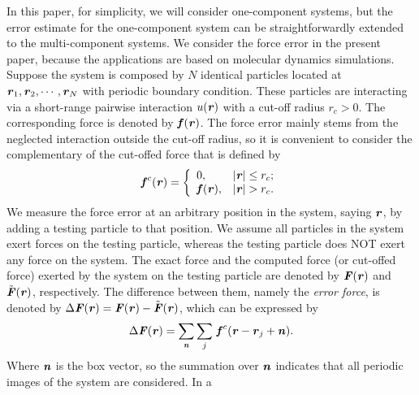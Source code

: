 \documentclass[preprint]{revtex4}
\renewcommand{\v}[1]{\textbf{\textit{#1}}}
\begin{document}
In this paper, for simplicity,
we will consider one-component systems, but
the error estimate for
the one-component system can be straightforwardly extended to the
multi-component systems.  We consider
the force error in the present paper, because the
applications are based on molecular dynamics simulations.
Suppose the system is composed by $N$ identical particles located at
$\v r_1, \v r_2, \cdots, \v r_N$ with periodic boundary condition.
These particles are interacting via a short-range pairwise interaction
$u(\v r)$ with a cut-off radius $r_c > 0$. The corresponding force is
denoted by $\v f(\v r)$. 
The force error mainly stems from the neglected interaction outside
the cut-off radius, so it is convenient to consider the complementary
of the cut-offed force that is defined by
\begin{align}
  \v f^c(\v r) =
  \left\{
  \begin{array}{ll}
    0, & \vert\v r\vert\leq r_c; \\
    \v f(\v r), & \vert\v r\vert > r_c.
  \end{array}
  \right.
\end{align}
We measure the force error at an arbitrary position in the system,
saying $\v r$, by adding a testing particle to that position.  We
assume all particles in the system exert forces on the testing
particle, whereas the testing particle does NOT exert any force on the
system.  The exact force and the computed force (or cut-offed force)
exerted by the system on the testing particle are denoted by ${\v
  F}(\v r)$ and $\tilde{\v F}(\v r)$, respectively.  The difference
between them, namely the \emph{error force}, is denoted by $\Delta\v
F(\v r) = \v F(\v r) - \tilde{\v F}(\v r)$, which can be expressed by
\begin{align}
  \Delta\v F(\v r) = \sum_{\v n}\sum_{j}\, \v f^c(\v r - \v r_j + \v n).
\end{align}
Where $\v n$ is the box vector, so the summation over $\v n$ indicates
that all periodic images of the system are considered. In a
\end{document}
